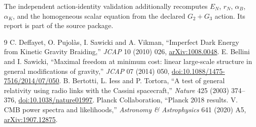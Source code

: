 \documentclass[11pt,a4paper]{article}
\begin{document}
The independent action-identity validation additionally recomputes $E_N$,
$r_N$, $\alpha_B$, $\alpha_K$, and the homogeneous scalar equation from the
declared $G_2+G_3$ action. Its report is part of the source package.

\begin{thebibliography}{9}
C. Deffayet, O. Pujol\`as, I. Sawicki and A. Vikman, ``Imperfect Dark Energy from Kinetic Gravity Braiding,'' \emph{JCAP} 10 (2010) 026, \href{https://arxiv.org/abs/1008.0048}{arXiv:1008.0048}.
E. Bellini and I. Sawicki, ``Maximal freedom at minimum cost: linear large-scale structure in general modifications of gravity,'' \emph{JCAP} 07 (2014) 050, \href{https://doi.org/10.1088/1475-7516/2014/07/050}{doi:10.1088/1475-7516/2014/07/050}.
B. Bertotti, L. Iess and P. Tortora, ``A test of general relativity using radio links with the Cassini spacecraft,'' \emph{Nature} 425 (2003) 374--376, \href{https://doi.org/10.1038/nature01997}{doi:10.1038/nature01997}.
Planck Collaboration, ``Planck 2018 results. V. CMB power spectra and likelihoods,'' \emph{Astronomy \& Astrophysics} 641 (2020) A5, \href{https://arxiv.org/abs/1907.12875}{arXiv:1907.12875}.
\end{thebibliography}
\end{document}
